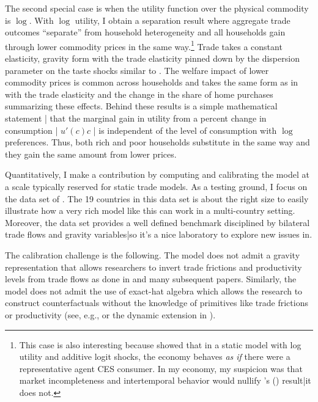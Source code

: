 \documentclass[12pt,pdftex]{article}
\def\citeapos#1{\citeauthor{#1}'s (\citeyear{#1})}
\begin{document}
\begin{onehalfspacing}
The second special case is when the utility function over the physical commodity is $\log$. With $\log$ utility, I obtain a separation result where aggregate trade outcomes ``separate'' from household heterogeneity and all households gain through lower commodity prices in the same way.\footnote{This case is also interesting because \citet*{anderson1987ces} showed that in a static model with log utility and additive logit shocks, the economy behaves \emph{as if} there were a representative agent CES consumer. In my economy, my suspicion was that market incompleteness and intertemporal behavior would nullify \citeapos{anderson1987ces} result|it does not.} Trade takes a constant elasticity, gravity form with the trade elasticity pinned down by the dispersion parameter on the taste shocks similar to \citet{eaton2002technology}. The welfare impact of lower commodity prices is common across households and takes the same form as in \citet{arkolakis2012new} with the trade elasticity and the change in the share of home purchases summarizing these effects. Behind these results is a simple mathematical statement | that the marginal gain in utility from a percent change in consumption | $u'(c)c$ | is independent of the level of consumption with $\log$ preferences. Thus, both rich and poor households substitute in the same way and they gain the same amount from lower prices.

Quantitatively, I make a contribution by computing and calibrating the model at a scale typically reserved for static trade models. As a testing ground, I focus on the data set of \citet{eaton2002technology}. The 19 countries in this data set is about the right size to easily illustrate how a very rich model like this can work in a multi-country setting. Moreover, the \citet{eaton2002technology} data set provides a well defined benchmark disciplined by bilateral trade flows and gravity variables|so it's a nice laboratory to explore new issues in.

The calibration challenge is the following. The model does not admit a gravity representation that allows researchers to invert trade frictions and productivity levels from trade flows as done in \citet{eaton2002technology} and many subsequent papers. Similarly, the model does not admit the use of exact-hat algebra which allows the research to construct counterfactuals without the knowledge of primitives like trade frictions or productivity (see, e.g., \citet{costinot2014trade} or the dynamic extension in \citet*{caliendo2015trade}).


\end{onehalfspacing}
\end{document}
